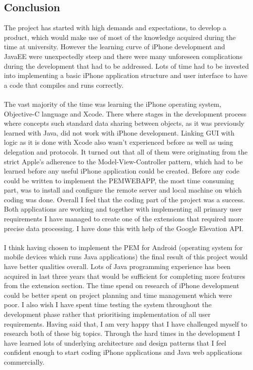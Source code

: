 \documentclass[12pt, a4paper]{report}   %
\begin{document}
\begin{enumerate}
\chapter{Conclusion}
The project has started with high demands and expectations, to develop a product, which would make use of most of the knowledge acquired during the time at university. However the learning curve of iPhone development and JavaEE were unexpectedly steep and there were many unforeseen complications during the development that had to be addressed. Lots of time had to be invested into implementing a basic iPhone application structure and user interface to have a code that compiles and runs correctly.\\ \\
The vast majority of the time was learning the iPhone operating system, Objective-C language and Xcode. There where stages in the development process where concepts such standard data sharing between objects, as it was previously learned with Java, did not work with iPhone development. Linking GUI with logic as it is done with Xcode also wasn't experienced before as well as using delegation and protocols. It turned out that all of them were originating from the strict Apple's adherence to the Model-View-Controller pattern, which had to be learned before any useful iPhone application could be created.
Before any code could be written to implement the PEMWEBAPP, the most time consuming part, was to install and configure the remote server and local machine on which coding was done.
Overall I feel that the coding part of the project was a success. Both applications are working and together with implementing all primary user requirements I have managed to create one of the extensions that required more precise data processing. I have done this with help of the Google Elevation API.\\ \\

I think having chosen to implement the PEM for Android (operating system for mobile devices which runs Java applications) the final result of this project would have better qualities overall. Lots of Java programming experience has been acquired in last three years that would be sufficient for completing more features from the extension section. The time spend on research of iPhone development could be better spent on project planning and time management which were poor. I also wish I have spent time testing the system throughout the development phase rather that prioritising implementation of all user requirements.
Having said that, I am very happy that I have challenged myself to research both of these big topics. Through the hard times in the development I have learned lots of underlying architecture and design patterns that I feel confident enough to start coding iPhone applications and Java web applications commercially.


\end{enumerate}
\end{document}
